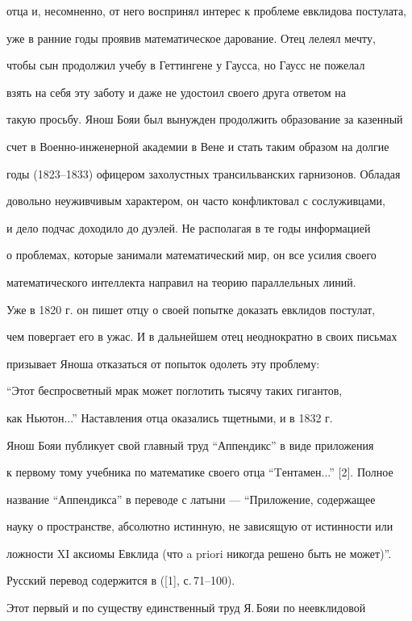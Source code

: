 отца и, несомненно, от него воспринял интерес к проблеме евклидова постулата, 


уже в ранние годы проявив математическое дарование. Отец лелеял мечту, 


чтобы сын продолжил учебу в Геттингене у Гаусса, но Гаусс не пожелал 


взять на себя эту заботу и даже не удостоил своего друга ответом на 


такую просьбу. Янош Бояи был вынужден продолжить образование за казенный 


счет в Военно-инженерной академии в Вене и стать таким образом на долгие 


годы (1823--1833) офицером захолустных трансильванских гарнизонов. Обладая 


довольно неуживчивым характером, он часто конфликтовал с сослуживцами, 


и дело подчас доходило до дуэлей. Не располагая в те годы информацией 


о проблемах, которые занимали математический мир, он все усилия своего 


математического интеллекта направил на теорию параллельных линий. 


Уже в 1820 г. он пишет отцу о своей попытке доказать евклидов постулат, 


чем повергает его в ужас. И в дальнейшем отец неоднократно в своих письмах 


призывает Яноша отказаться от попыток одолеть эту проблему:


``Этот беспросветный мрак может поглотить тысячу таких гигантов, 


как Ньютон...'' Наставления отца оказались тщетными, и в 1832 г. 


Янош Бояи публикует свой главный труд ``Аппендикс'' в виде приложения


к первому тому учебника по математике своего отца ``Tентамен...'' [2]. Полное 


название ``Аппендикса'' в переводе с латыни --- ``Приложение, содержащее 


науку о пространстве, абсолютно истинную, не зависящую от истинности или 


ложности XI аксиомы Евклида (что a priori никогда решено быть не может)''.


Русский перевод содержится в ([1], с.\,71--100).





Этот первый и по существу единственный труд Я.\,Бояи по неевклидовой 



